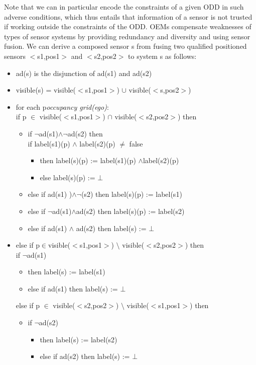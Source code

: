 Note that we can in particular encode the constraints of a given ODD in such adverse conditions, which thus entails that information of a sensor is not trusted if working outside the constraints of the ODD. OEMs compensate weaknesses of types of sensor systems by providing redundancy and diversity and using sensor fusion. We can derive a composed sensor s from fusing two qualified positioned sensors $<$s1,pos1$>$  and $<$s2,pos2$>$ to system s as follows:
\begin{itemize}
\item ad(s) is the disjunction of ad(s1) and ad(s2)
\item visible(s) = visible($<$s1,pos1$>$) $\cup$ visible($<$s,pos2$>$)
\item for each p\in \textit{occupancy grid(ego)}:  \\
if p $\in$ visible($<$s1,pos1$>$) $\cap$ visible($<$s2,pos2$>$) then
\begin{itemize}
\item if $\neg$ad(s1)$\land\neg $ad(s2) then\\
if label(s1)(p) $\land$ label(s2)(p) $\not=$ false 
\begin{itemize}
\item[] then label(s)(p) := label(s1)(p) $\land $label(s2)(p)
\item[] else label(s)(p) := $\bot$
\end{itemize}
\item[] else if ad(s1) )$\land\neg$(s2) then label(s)(p) := label(s1)
\item[] else if $\neg$ad(s1)$\land$ad(s2) then label(s)(p) := label(s2)
\item[] else if ad(s1) $\land$ ad(s2) then label(s) := $\bot$
\end{itemize}
\item[] else if p$\in$visible($<$s1,pos1$>$) $\setminus$ visible($<$s2,pos2$>$) then\\	
if $\neg$ad(s1)
\begin{itemize}
    \item[] then label(s) := label(s1)
	\item[] else if ad(s1) then label(s) := $\bot$
	\end{itemize}
	else if p $\in$ visible($<$s2,pos2$>$) $\setminus$ visible($<$s1,pos1$>$) then
	\begin{itemize}
	\item[] if $\neg$ad(s2) 
	\begin{itemize}
	    \item[]then label(s) := label(s2)
	\item[] else if ad(s2) then label(s) := $\bot$
    \end{itemize}
    \end{itemize}
\end{itemize}
